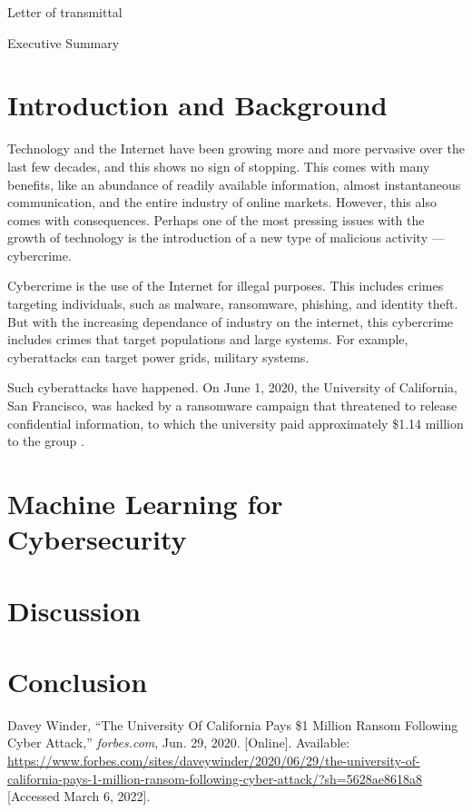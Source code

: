 \documentclass[12pt]{article}
\begin{document}
    Letter of transmittal

    \pagebreak

    

    Executive Summary

    \pagebreak

    \tableofcontents

    \pagebreak

    \section{Introduction and Background}
    Technology and the Internet have been growing more and more pervasive over the last few decades, and this shows no sign of stopping.
    This comes with many benefits, like an abundance of readily available information, almost instantaneous communication, and the entire industry of online markets.
    However, this also comes with consequences.
    Perhaps one of the most pressing issues with the growth of technology is the introduction of a new type of malicious activity --- cybercrime.

    Cybercrime is the use of the Internet for illegal purposes.
    This includes crimes targeting individuals, such as malware, ransomware, phishing, and identity theft.
    But with the increasing dependance of industry on the internet, this cybercrime includes crimes that target populations and large systems.
    For example, cyberattacks can target power grids, military systems.

    Such cyberattacks have happened.
    On June 1, 2020, the University of California, San Francisco, was hacked by a ransomware campaign that threatened to release confidential information, to which the university paid approximately \$1.14 million to the group \cite{winder2020}.

    \section{Machine Learning for Cybersecurity}

    \section{Discussion}

    \pagebreak

    \section{Conclusion}

    \pagebreak

    \begin{thebibliography}{99}
        Davey Winder, ``The University Of California Pays \$1 Million Ransom Following Cyber Attack,''
        \textit{forbes.com}, Jun. 29, 2020. [Online].
        Available: \href{https://www.forbes.com/sites/daveywinder/2020/06/29/the-university-of-california-pays-1-million-ransom-following-cyber-attack/?sh=5628ae8618a8}{https://www.forbes.com/sites/daveywinder/2020/06/29/the-university-of-california-pays-1-million-ransom-following-cyber-attack/?sh=5628ae8618a8}
        [Accessed March 6, 2022].
    \end{thebibliography}
\end{document}
